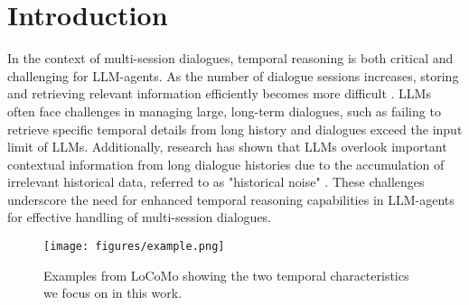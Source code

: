 \section{Introduction}


In the context of multi-session dialogues, temporal reasoning is both critical and challenging for LLM-agents. As the number of dialogue sessions increases, storing and retrieving relevant information efficiently becomes more difficult \cite{maharana-etal-2024-evaluating}. LLMs often face challenges in managing large, long-term dialogues, such as failing to retrieve specific temporal details from long history and dialogues exceed the input limit of LLMs. Additionally, research has shown that LLMs overlook important contextual information from long dialogue histories due to the accumulation of irrelevant historical data, referred to as "historical noise" \cite{wang2023enhancing}. 
These challenges underscore the need for enhanced temporal reasoning capabilities in LLM-agents for effective handling of multi-session dialogues.



\begin{figure}  
\centering
\texttt{[image: figures/example.png]}
    \caption{Examples from LoCoMo showing the two temporal characteristics we focus on in this work.} 
    \label{fig:example}
\vspace{-5mm}
\end{figure}

